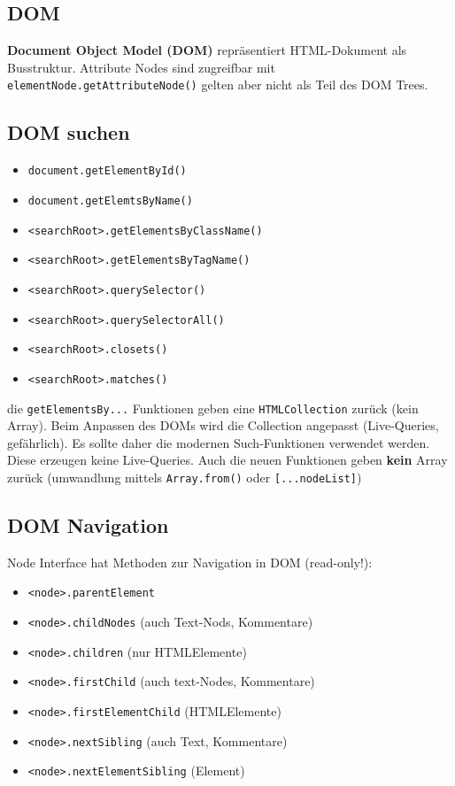 \documentclass[11pt,twoside,landscape]{article}
\begin{document}
\begin{multicols}{4}
\section*{DOM}
\label{sec:org1a28819}
\textbf{Document Object Model (DOM)} repräsentiert HTML-Dokument als Busstruktur. Attribute Nodes sind zugreifbar mit \texttt{elementNode.getAttributeNode()} gelten aber nicht als Teil des DOM Trees.

\subsection*{DOM suchen}
\label{sec:org2ee09f2}
\begin{itemize}
\item \texttt{document.getElementById()}
\item \texttt{document.getElemtsByName()}
\item \texttt{<searchRoot>.getElementsByClassName()}
\item \texttt{<searchRoot>.getElementsByTagName()}
\item \texttt{<searchRoot>.querySelector()}
\item \texttt{<searchRoot>.querySelectorAll()}
\item \texttt{<searchRoot>.closets()}
\item \texttt{<searchRoot>.matches()}
\end{itemize}

die \texttt{getElementsBy...} Funktionen geben eine \texttt{HTMLCollection} zurück (kein Array). Beim Anpassen des DOMs wird die Collection angepasst (Live-Queries, gefährlich). Es sollte daher die modernen Such-Funktionen verwendet werden. Diese erzeugen keine Live-Queries. Auch die neuen Funktionen geben \textbf{kein} Array zurück (umwandlung mittels \texttt{Array.from()} oder \texttt{[...nodeList]})

\subsection*{DOM Navigation}
\label{sec:orgb8a2b81}
Node Interface hat Methoden zur Navigation in DOM (read-only!):
\begin{itemize}
\item \texttt{<node>.parentElement}
\item \texttt{<node>.childNodes} (auch Text-Nods, Kommentare)
\item \texttt{<node>.children} (nur HTMLElemente)
\item \texttt{<node>.firstChild} (auch text-Nodes, Kommentare)
\item \texttt{<node>.firstElementChild} (HTMLElemente)
\item \texttt{<node>.nextSibling} (auch Text, Kommentare)
\item \texttt{<node>.nextElementSibling} (Element)
\end{itemize}


\end{multicols}
\end{document}
